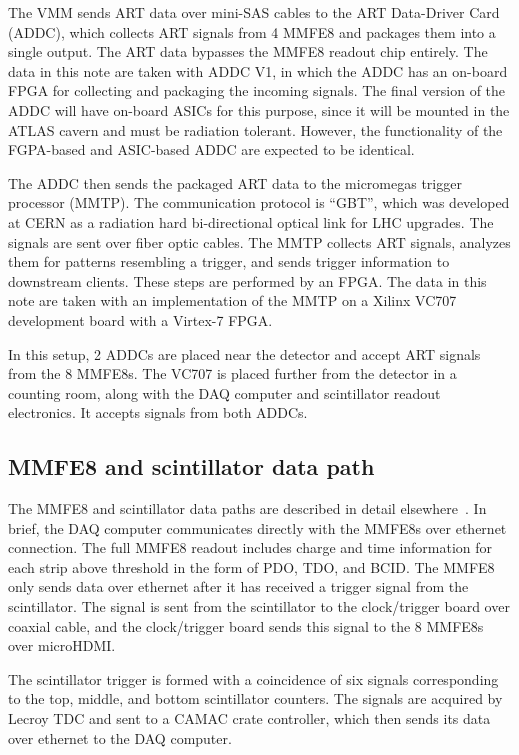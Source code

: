 The VMM sends ART data over mini-SAS cables to the ART Data-Driver Card (ADDC), which collects ART signals from 4 MMFE8 and packages them into a single output. The ART data bypasses the MMFE8 readout chip entirely. The data in this note are taken with ADDC V1, in which the ADDC has an on-board FPGA for collecting and packaging the incoming signals. The final version of the ADDC will have on-board ASICs for this purpose, since it will be mounted in the ATLAS cavern and must be radiation tolerant. However, the functionality of the FGPA-based and ASIC-based ADDC are expected to be identical.

The ADDC then sends the packaged ART data to the micromegas trigger processor (MMTP). The communication protocol is ``GBT'', which was developed at CERN as a radiation hard bi-directional optical link for LHC upgrades. The signals are sent over fiber optic cables. The MMTP collects ART signals, analyzes them for patterns resembling a trigger, and sends trigger information to downstream clients. These steps are performed by an FPGA. The data in this note are taken with an implementation of the MMTP on a Xilinx VC707 development board with a Virtex-7 FPGA.

In this setup, 2 ADDCs are placed near the detector and accept ART signals from the 8 MMFE8s. The VC707 is placed further from the detector in a counting room, along with the DAQ computer and scintillator readout electronics. It accepts signals from both ADDCs.

\subsection{MMFE8 and scintillator data path}
\label{sec:exp-mmfe}

The MMFE8 and scintillator data paths are described in detail elsewhere~\cite{noisy,noiseless}. In brief, the DAQ computer communicates directly with the MMFE8s over ethernet connection. The full MMFE8 readout includes charge and time information for each strip above threshold in the form of PDO, TDO, and BCID. The MMFE8 only sends data over ethernet after it has received a trigger signal from the scintillator. The signal is sent from the scintillator to the clock/trigger board over coaxial cable, and the clock/trigger board sends this signal to the 8 MMFE8s over microHDMI.

The scintillator trigger is formed with a coincidence of six signals corresponding to the top, middle, and bottom scintillator counters. The signals are acquired by Lecroy TDC and sent to a CAMAC crate controller, which then sends its data over ethernet to the DAQ computer.


